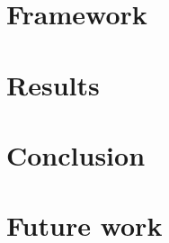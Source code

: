 \documentclass[11pt,english,openright]{book}
\begin{document}
\chapter{Framework\label{ch:framework}}


\chapter{Results\label{ch:results}}


\chapter{Conclusion\label{ch:conclusion}}


\chapter{Future work\label{ch:future-work}}






\listoffigures
{}

\listoftables
{}
\end{document}
